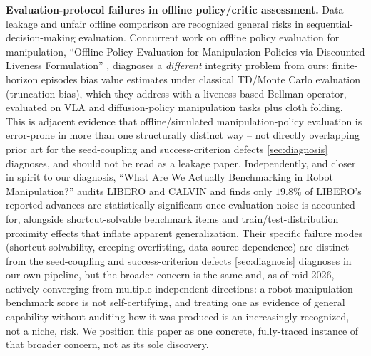 \documentclass[journal]{IEEEtran}
\begin{document}
\textbf{Evaluation-protocol failures in offline policy/critic assessment.}
Data leakage and unfair offline comparison are recognized general risks in
sequential-decision-making evaluation. Concurrent work on offline policy
evaluation for manipulation, ``Offline Policy Evaluation for Manipulation
Policies via Discounted Liveness Formulation''
\cite{offlinerl_leakage2026}, diagnoses a \emph{different} integrity
problem from ours: finite-horizon episodes bias value estimates under
classical TD/Monte Carlo evaluation (truncation bias), which they address
with a liveness-based Bellman operator, evaluated on VLA and
diffusion-policy manipulation tasks plus cloth folding. This is adjacent
evidence that offline/simulated manipulation-policy evaluation is
error-prone in more than one structurally distinct way -- not directly
overlapping prior art for the seed-coupling and success-criterion defects
\cref{sec:diagnosis} diagnoses, and should not be read as a leakage paper.
Independently, and closer in spirit to our diagnosis, ``What Are We
Actually Benchmarking in Robot Manipulation?''
\cite{jiang2026benchmarking} audits LIBERO and CALVIN and finds only
$19.8\%$ of LIBERO's reported advances are statistically significant once
evaluation noise is accounted for, alongside shortcut-solvable benchmark
items and train/test-distribution proximity effects that inflate apparent
generalization. Their specific failure modes (shortcut solvability,
creeping overfitting, data-source dependence) are distinct from the
seed-coupling and success-criterion defects \cref{sec:diagnosis} diagnoses
in our own pipeline, but the broader concern is the same and, as of
mid-2026, actively converging from multiple independent directions: a
robot-manipulation benchmark score is not self-certifying, and treating one
as evidence of general capability without auditing how it was produced is
an increasingly recognized, not a niche, risk. We position this paper as
one concrete, fully-traced instance of that broader concern, not as its
sole discovery.
\end{document}
